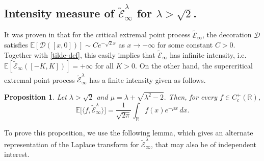 \documentclass[a4paper,reqno]{amsart}%
\newcommand{\1}{\mathbf 1}
\theoremstyle{mine}
\numberwithin{theorem}{section}
\newtheorem{proposition}[theorem]{Proposition}
\numberwithin{equation}{section}
\theoremstyle{remark}
\begin{document}
\subsection{Intensity measure of $\widetilde{\mathcal{E}}_\infty^\lambda$ for $\lambda>\sqrt{2}$.}

It was proven in \cite{Lisa_P} that for the critical extremal point process $\widetilde{\mathcal{E}}_\infty$, the decoration $\mathcal{D}$ satisfies $\mathbb{E}[\mathcal{D}([x,0])] \sim Ce^{-\sqrt{2}x}$ as $x\to -\infty$ for some constant $C>0$. Together with \eqref{tilde-def}, this easily implies that $\widetilde{\mathcal{E}}_\infty$ has infinite intensity, i.e. $\mathbb{E}[\widetilde{\mathcal{E}}_\infty([-K, K])] = +\infty $ for all $K>0$. On the other hand, the supercritical extremal point process $\widetilde{\mathcal{E}}_\infty^\lambda$ has a finite intensity given as follows. 


\begin{proposition}\label{supercritical-intensity}
Let $\lambda>\sqrt2$ and $ \mu=\lambda+\sqrt{\lambda^2-2}. $ Then, for every $f\in C_c^+(\mathbb R)$, 
 \begin{equation} \mathbb E\big[ \langle f,\widetilde{\mathcal E}^{\lambda}_{\infty}\rangle \big] = \frac{1}{\sqrt{2\pi}}\int_{\mathbb R} f(x)e^{-\mu x}\,dx . \end{equation} 
\end{proposition}
To prove this proposition, we use the following lemma, which gives an alternate representation of the Laplace transform for $\widetilde{\mathcal E}^{\lambda}_{\infty}$, that may also be of independent interest.
\end{document}
